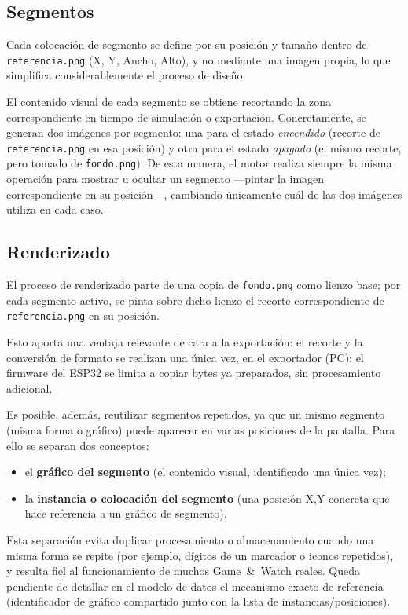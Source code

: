 \documentclass[../main.tex]{subfiles}
\begin{document}
	\subsection{Segmentos}
	\label{sec:segmentos}

	Cada colocación de segmento se define por su posición y tamaño dentro de \texttt{referencia.png} (X, Y, Ancho, Alto), y no mediante una imagen propia, lo que simplifica considerablemente el proceso de diseño.

	El contenido visual de cada segmento se obtiene recortando la zona correspondiente en tiempo de simulación o exportación. Concretamente, se generan dos imágenes por segmento: una para el estado \emph{encendido} (recorte de \texttt{referencia.png} en esa posición) y otra para el estado \emph{apagado} (el mismo recorte, pero tomado de \texttt{fondo.png}). De esta manera, el motor realiza siempre la misma operación para mostrar u ocultar un segmento —pintar la imagen correspondiente en su posición—, cambiando únicamente cuál de las dos imágenes utiliza en cada caso.

	\subsection{Renderizado}
	\label{sec:renderizado}

	El proceso de renderizado parte de una copia de \texttt{fondo.png} como lienzo base; por cada segmento activo, se pinta sobre dicho lienzo el recorte correspondiente de \texttt{referencia.png} en su posición.

	Esto aporta una ventaja relevante de cara a la exportación: el recorte y la conversión de formato se realizan una única vez, en el exportador (PC); el firmware del ESP32 se limita a copiar bytes ya preparados, sin procesamiento adicional.

	Es posible, además, reutilizar segmentos repetidos, ya que un mismo segmento (misma forma o gráfico) puede aparecer en varias posiciones de la pantalla. Para ello se separan dos conceptos:
	\begin{itemize}
		\item el \textbf{gráfico del segmento} (el contenido visual, identificado una única vez);
		\item la \textbf{instancia o colocación del segmento} (una posición X,Y concreta que hace referencia a un gráfico de segmento).
	\end{itemize}

	Esta separación evita duplicar procesamiento o almacenamiento cuando una misma forma se repite (por ejemplo, dígitos de un marcador o iconos repetidos), y resulta fiel al funcionamiento de muchos Game~\&~Watch reales. Queda pendiente de detallar en el modelo de datos el mecanismo exacto de referencia (identificador de gráfico compartido junto con la lista de instancias/posiciones).
\end{document}
